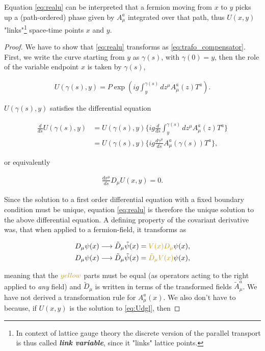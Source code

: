 \documentclass{article}
\theoremstyle{plain} %
\theoremstyle{convention} %
\theoremstyle{remark} %
\def\df#1{\textbf{\textit{#1}}}
\numberwithin{equation}{section}
\begin{document}
Equation \eqref{eq:realu} can be interpreted that a fermion moving from $x$ to $y$ picks up a (path-ordered) phase given by $A_{\mu}^a$ integrated over that path, thus $U(x,y)$ "links"\footnote{In context of lattice gauge theory the discrete version of the parallel transport is thus called \df{link variable}, since it "links" lattice points.} space-time points $x$ and $y$.

\begin{proof}

We have to show that \eqref{eq:realu} transforms as \eqref{eq:trafo_compensator}. First, we write the curve starting from $y$ as $\gamma(s)$, with $\gamma(0)=y$, then the role of the variable endpoint $x$ is taken by $\gamma(s)$,

\begin{align*}
    U(\gamma(s) ,y) = P \exp( ig \int_{y}^{\gamma(s)} d z^{\mu} A_{\mu}^a(z) T^a ).
\end{align*}

$U(\gamma(s) ,y)$ satisfies the differential equation

\begin{align*}
    \frac{d}{ds} U(\gamma(s) ,y) &= U(\gamma(s) ,y) \bigg\{ ig \frac{d}{ds} \int_{y}^{\gamma(s)} d z^{\mu} A_{\mu}^a(z) T^a \bigg\} \\
    &= U(\gamma(s) ,y) \bigg\{ ig \frac{d \gamma^{\mu}}{ds} A_{\mu}^a(\gamma(s)) T^a \bigg\},
\end{align*}

or equivalently

\begin{align}
    \frac{dx^{\mu}}{ds} D_{\mu} U(x,y) = 0. \label{eq:Udgl}
\end{align}

Since the solution to a first order differential equation with a fixed boundary condition must be unique, equation \eqref{eq:realu} is therefore the unique solution to the above differential equation. A defining property of the covariant derivative was, that when applied to a fermion-field, it transforms as

\begin{align*}
    D_{\mu} \psi(x) &\longrightarrow \tilde{D}_{\mu} \tilde{\psi}(x) = \textcolor{cyellow}{V(x) D_{\mu}} \psi(x), \\
    D_{\mu} \psi(x) &\longrightarrow \tilde{D}_{\mu} \tilde{\psi}(x) = \textcolor{cyellow}{\tilde{D}_{\mu} V(x)} \psi(x),
\end{align*}

meaning that the $\textcolor{cyellow}{yellow}$ parts must be equal (as operators acting to the right applied to \textit{any} field) and $\tilde{D}_{\mu}$ is written in terms of the transformed fields $\tilde{A}_{\mu}^a$. We have not derived a transformation rule for $A_{\mu}^a(x)$. We also don't have to because, if $U(x,y)$ is the solution to \eqref{eq:Udgl}, then


\end{proof}
\end{document}
